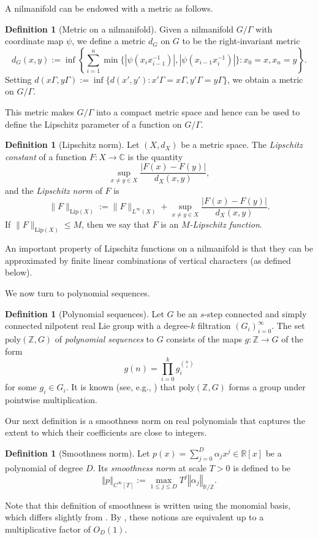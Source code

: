\documentclass[11pt]{amsart}
\theoremstyle{definition}
\newtheorem{definition}[lemma]{Definition}
\newcommand{\norm}[1]{\left\Vert #1\right\Vert}
\begin{document}
A nilmanifold can be endowed with a metric as follows.
\begin{definition}[Metric on a nilmanifold]\label{d:metricnilmanifold}
Given a nilmanifold $G/\Gamma$ with coordinate map $\psi$, we define a metric $d_G$ on $G$ to be the right-invariant metric
$$d_{G}(x, y) := \inf\left\{\sum_{i = 1}^n \min\{|\psi(x_ix_{i - 1}^{-1})|, |\psi(x_{i - 1}x_i^{-1})|\}: x_0 = x, x_n = y\right\}.$$
Setting $d(x\Gamma, y\Gamma) := \inf\{d(x', y'): x'\Gamma = x\Gamma, y'\Gamma = y\Gamma\}$, we obtain a metric on $G/\Gamma$.
\end{definition}
This metric makes $G/\Gamma$ into a compact metric space and hence can be used to define the Lipschitz parameter of a function on $G/\Gamma$.
\begin{definition}[Lipschitz norm]
    Let $(X, d_X)$ be a metric space.  The \emph{Lipschitz constant} of a function $F\colon X \to \mathbb{C}$ is the quantity $$\sup_{x \neq y \in X} \frac{|F(x) - F(y)|}{d_X(x, y)},$$ and the \emph{Lipschitz norm} of $F$ is
$$\|F\|_{\mathrm{Lip}(X)} := \|F\|_{L^\infty(X)} + \sup_{x \neq y \in X} \frac{|F(x) - F(y)|}{d_X(x, y)}.$$
If $\|F\|_{\mathrm{Lip}(X)} \le M$, then we say that $F$ is an \emph{$M$-Lipschitz function}.
\end{definition}
An important property of Lipschitz functions on a nilmanifold is that they can be approximated by finite linear combinations of vertical characters (as defined below). 

We now turn to polynomial sequences.
\begin{definition}[Polynomial sequences]
Let $G$ be an $s$-step connected and simply connected nilpotent real Lie group with a degree-$k$ filtration $(G_i)_{i = 0}^\infty$. 
The set $\mathrm{poly}(\mathbb{Z}, G)$ of \emph{polynomial sequences} to $G$ consists of the maps $g\colon \mathbb{Z} \to G$ of the form
$$g({n}) = \prod_{{i}=0}^k g_{{i}}^{\binom{{n}}{{i}}}$$
for some $g_i \in G_i$. 
It is known (see, e.g., \cite[Chapter 14]{HK18}) that $\mathrm{poly}(\mathbb{Z}, G)$ forms a group under pointwise multiplication.
\end{definition}

Our next definition is a smoothness norm on real polynomials that captures the extent to which their coefficients are close to integers. 
\begin{definition}[Smoothness norm]\label{def:smoothness}
Let $p(x)=\sum_{j=0}^D \alpha_j x^j \in \mathbb{R}[x]$ be a polynomial of degree $D$.  Its \emph{smoothness norm} at scale $T>0$ is defined to be
$$\norm{p}_{C^\infty[T]}:=\max_{1 \leq j \leq D}T^{j} \norm{\alpha_j}_{\mathbb{R}/\mathbb{Z}}.$$
\end{definition}
Note that this definition of smoothness is written using the monomial basis, which differs slightly from \cite[Definition 2.2]{Leng23b}. By \cite[Lemma A.10]{Leng23b}, these notions are equivalent up to a multiplicative factor of $O_D(1)$.
\end{document}
